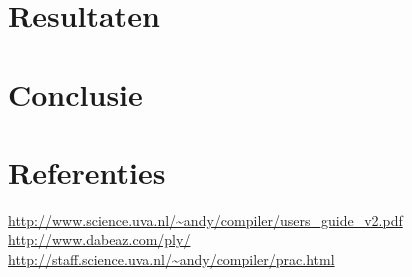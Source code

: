 \documentclass[11pt]{article}
\begin{document}
\section{Resultaten}

\section{Conclusie}

\section{Referenties}

\url{http://www.science.uva.nl/~andy/compiler/users_guide_v2.pdf}\\
\url{http://www.dabeaz.com/ply/}\\
\url{http://staff.science.uva.nl/~andy/compiler/prac.html}
\end{document}

